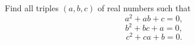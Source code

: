 Find all triples $(a, b, c)$ of real numbers such that$$ a^2 + ab + c = 0, $$$$b^2 + bc + a = 0, $$$$c^2 + ca + b = 0.$$